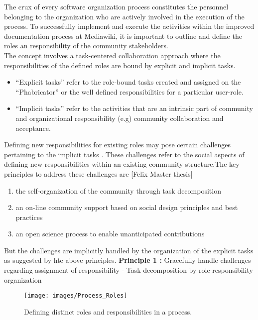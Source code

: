 \indent The crux of every software organization process constitutes the personnel belonging to the organization who are actively involved in the execution of the process. To successfully implement and execute the activities within the improved documentation process at Mediawiki, it is important to outline and define the roles an responsibility of the community stakeholders. 
\\\indent The concept involves a task-centered collaboration approach where the responsibilities of the defined roles are bound by explicit and implicit tasks. 
\begin{itemize}
\item \enquote{Explicit tasks} refer to the role-bound tasks created and assigned on the \enquote{Phabricator} or the well defined responsibilities for a particular user-role.
\item \enquote{Implicit tasks} refer to the activities that are an intrinsic part of community and organizational responsibility (e.g) community collaboration and acceptance.
\end{itemize}
Defining new responsibilities for existing roles may pose certain challenges pertaining to the implicit tasks . These challenges refer to the social aspects of defining new responsibilities within an existing community structure.The key principles to address these challenges are [Felix Master thesis]
\begin{enumerate}
\item the self-organization of the community through task decomposition
\item an on-line community support based on social design principles and best practices
\item an open science process to enable unanticipated contributions
\end{enumerate}

But the challenges are implicitly handled by the organization of the explicit tasks as suggested by hte above principles. 
\newline
\indent \textbf{Principle 1 : }  Gracefully handle challenges regarding assignment of responsibility  - Task decomposition by role-responsibility organization
\begin{figure}[H]
  \centering
  \texttt{[image: images/Process\_Roles]}
  \caption[Defining distinct roles and responsibilities in a process]{Defining distinct roles and responsibilities in a process.}\label{fig:Process_Roles}
\end{figure}


